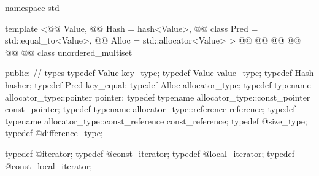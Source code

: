 \documentclass[american,twoside]{book}
\begin{document}
%
\begin{codeblock}
namespace std {
  template <@@ Value,
            @@ Hash = hash<Value>,
            @@ class Pred = std::equal_to<Value>,
            @@ Alloc = std::allocator<Value> >
  @@
           @@
           @@
           @@
           @@
           @@
  class unordered_multiset
  {
  public:
    // types
    typedef Value                                    key_type;
    typedef Value                                    value_type;
    typedef Hash                                     hasher;
    typedef Pred                                     key_equal;
    typedef Alloc                                    allocator_type;
    typedef typename allocator_type::pointer         pointer;
    typedef typename allocator_type::const_pointer   const_pointer;
    typedef typename allocator_type::reference       reference;
    typedef typename allocator_type::const_reference const_reference;
    typedef @\impdef@                   size_type;
    typedef @\impdef@                   difference_type;

    typedef @\impdef@                   iterator;
    typedef @\impdef@                   const_iterator;
    typedef @\impdef@                   local_iterator;
    typedef @\impdef@                   const_local_iterator;

}}
\end{codeblock}
\end{document}
